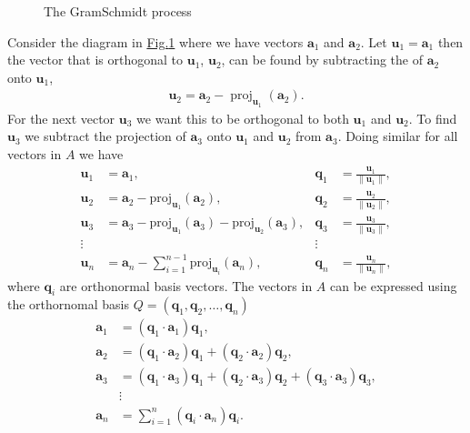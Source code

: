 \documentclass[letterpaper,10pt,english]{jupyterBook}
\begin{document}
\begin{figure}[htbp]
\centering
\capstart

\noindent{}
\caption{The Gram\sphinxhyphen{}Schmidt process}\label{\detokenize{6_Direct_methods/6.4_QR_decomposition:gram-schmidt-figure}}\end{figure}

\sphinxAtStartPar
Consider the diagram in \hyperref[\detokenize{6_Direct_methods/6.4_QR_decomposition:gram-schmidt-figure}]{Fig.\@ \ref{\detokenize{6_Direct_methods/6.4_QR_decomposition:gram-schmidt-figure}}} where we have vectors \(\mathbf{a}_1\) and \(\mathbf{a}_2\). Let \(\mathbf{u}_1 = \mathbf{a}_1\) then the vector that is orthogonal to \(\mathbf{u}_1\), \(\mathbf{u}_2\), can be found by subtracting the  of \(\mathbf{a}_2\) onto \(\mathbf{u}_1\),
\begin{align*}
    \mathbf{u}_2 =\mathbf{a}_2 - \operatorname{proj}_{\mathbf{u}_1 } (\mathbf{a}_2).
\end{align*}
\sphinxAtStartPar
For the next vector \(\mathbf{u}_3\) we want this to be orthogonal to both \(\mathbf{u}_1\) and \(\mathbf{u}_2\). To find \(\mathbf{u}_3\) we subtract the projection of \(\mathbf{a}_3\) onto \(\mathbf{u}_1\) and \(\mathbf{u}_2\) from \(\mathbf{a}_3\). Doing similar for all vectors in \(A\) we have
\begin{align*}
    \mathbf{u}_1 &=\mathbf{a}_1 , & 
    \mathbf{q}_1 &=\frac{\mathbf{u}_1 }{\|\mathbf{u}_1 \|},\\
    \mathbf{u}_2 &=\mathbf{a}_2 -{\textrm{proj}}_{\mathbf{u}_1 } (\mathbf{a}_2 ), & 
    \mathbf{q}_2 &=\frac{\mathbf{u}_2 }{\|\mathbf{u}_2 \|},\\
    \mathbf{u}_3 &=\mathbf{a}_3 -{\textrm{proj}}_{\mathbf{u}_1 } (\mathbf{a}_3 )-{\textrm{proj}}_{\mathbf{u}_2 } (\mathbf{a}_3 ), & 
    \mathbf{q}_3 &=\frac{\mathbf{u}_3 }{\|\mathbf{u}_3 \|},\\
    \vdots  & & \vdots \\
    \mathbf{u}_n &=\mathbf{a}_n -\sum_{i=1}^{n-1} {\textrm{proj}}_{\mathbf{u}_i } (\mathbf{a}_n ), & 
    \mathbf{q}_n &=\frac{\mathbf{u}_n }{\|\mathbf{u}_n \|},
\end{align*}
\sphinxAtStartPar
where \(\mathbf{q}_i\) are orthonormal basis vectors. The vectors in \(A\) can be expressed using the orthornomal basis \(Q=(\mathbf{q}_1 ,\mathbf{q}_2 ,\dots ,\mathbf{q}_n)\)
\begin{align*}
    \mathbf{a}_1 &=(\mathbf{q}_1 \cdot \mathbf{a}_1 )\mathbf{q}_1, \\
    \mathbf{a}_2 &=(\mathbf{q}_1 \cdot \mathbf{a}_2 )\mathbf{q}_1 +(\mathbf{q}_2 \cdot \mathbf{a}_2 )\mathbf{q}_2 , \\
    \mathbf{a}_3 &=(\mathbf{q}_1 \cdot \mathbf{a}_3 )\mathbf{q}_1 +(\mathbf{q}_2 \cdot \mathbf{a}_3 )\mathbf{q}_2 +(\mathbf{q}_3 \cdot \mathbf{a}_3 )\mathbf{q}_3, \\
    &\vdots \\
    \mathbf{a}_n &=\sum_{i=1}^n (\mathbf{q}_i \cdot \mathbf{a}_n )\mathbf{q}_i .
\end{align*}
\end{document}
